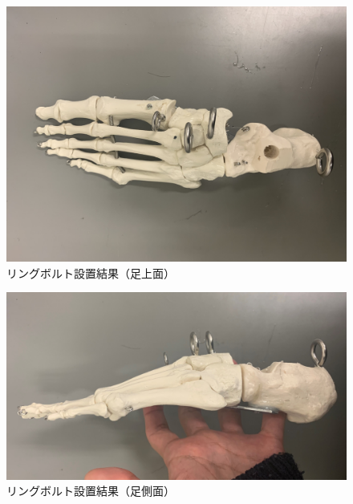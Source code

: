 \begin{figure}[h]
    \begin{center}
     \includegraphics[width=0.6\columnwidth,clip]{./2_measurement/foot.eps}
     \caption{リングボルト設置結果（足上面）}
     \label{fig:foot}
    \end{center}
\end{figure}
\begin{figure}[h]
    \begin{center}
     \includegraphics[width=0.6\columnwidth,clip]{./2_measurement/footside.eps}
     \caption{リングボルト設置結果（足側面）}
     \label{fig:footside}
    \end{center}
\end{figure}

